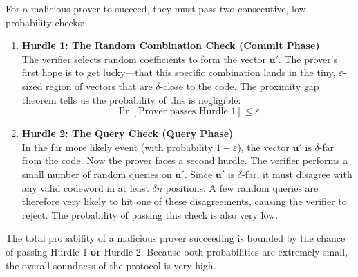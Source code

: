 \documentclass{article}
\begin{document}
\begin{tcolorbox}[breakable, title={The Verifier's Two Hurdles for a Malicious Prover}]
For a malicious prover to succeed, they must pass two consecutive, low-probability checks:

\begin{enumerate}
    \item \textbf{Hurdle 1: The Random Combination Check (Commit Phase)} \\
    The verifier selects random coefficients to form the vector $\mathbf{u}'$. The prover's first hope is to get lucky—that this specific combination lands in the tiny, $\varepsilon$-sized region of vectors that are $\delta$-close to the code. The proximity gap theorem tells us the probability of this is negligible:
    \[ \Pr[\text{Prover passes Hurdle 1}] \le \varepsilon \]

    \item \textbf{Hurdle 2: The Query Check (Query Phase)} \\
    In the far more likely event (with probability $1-\varepsilon$), the vector $\mathbf{u}'$ is $\delta$-far from the code. Now the prover faces a second hurdle. The verifier performs a small number of random queries on $\mathbf{u}'$. Since $\mathbf{u}'$ is $\delta$-far, it must disagree with any valid codeword in at least $\delta n$ positions. A few random queries are therefore very likely to hit one of these disagreements, causing the verifier to reject. The probability of passing this check is also very low.
\end{enumerate}
The total probability of a malicious prover succeeding is bounded by the chance of passing Hurdle 1 \textbf{or} Hurdle 2. Because both probabilities are extremely small, the overall soundness of the protocol is very high.
\end{tcolorbox}






 
\end{document}
